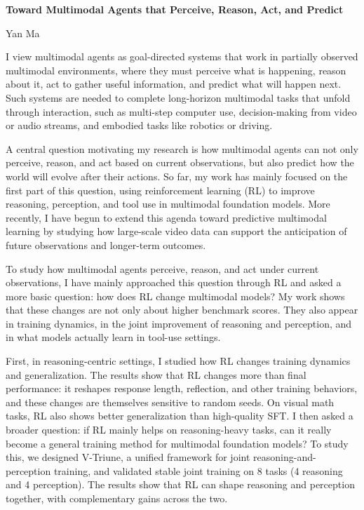 \documentclass[10pt,letterpaper]{article}
\begin{document}
\begin{center}
{\LARGE\bfseries Toward Multimodal Agents that Perceive, Reason, Act, and Predict\par}
\vspace{0.2em}
{\normalsize Yan Ma\par}
\end{center}

\vspace{0.45em}

\noindent
\begin{minipage}[t]{0.485\textwidth}
\small

I view multimodal agents as goal-directed systems that work in partially observed multimodal environments, where they must perceive what is happening, reason about it, act to gather useful information, and predict what will happen next. Such systems are needed to complete long-horizon multimodal tasks that unfold through interaction, such as multi-step computer use, decision-making from video or audio streams, and embodied tasks like robotics or driving.

A central question motivating my research is how multimodal agents can not only perceive, reason, and act based on current observations, but also predict how the world will evolve after their actions. So far, my work has mainly focused on the first part of this question, using reinforcement learning (RL) to improve reasoning, perception, and tool use in multimodal foundation models. More recently, I have begun to extend this agenda toward predictive multimodal learning by studying how large-scale video data can support the anticipation of future observations and longer-term outcomes.

To study how multimodal agents perceive, reason, and act under current observations, I have mainly approached this question through RL and asked a more basic question: how does RL change multimodal models? My work shows that these changes are not only about higher benchmark scores. They also appear in training dynamics, in the joint improvement of reasoning and perception, and in what models actually learn in tool-use settings.

First, in reasoning-centric settings, I studied how RL changes training dynamics and generalization. The results show that RL changes more than final performance: it reshapes response length, reflection, and other training behaviors, and these changes are themselves sensitive to random seeds. On visual math tasks, RL also shows better generalization than high-quality SFT. I then asked a broader question: if RL mainly helps on reasoning-heavy tasks, can it really become a general training method for multimodal foundation models? To study this, we designed V-Triune, a unified framework for joint reasoning-and-perception training, and validated stable joint training on 8 tasks (4 reasoning and 4 perception). The results show that RL can shape reasoning and perception together, with complementary gains across the two.


\end{minipage}
\end{document}
